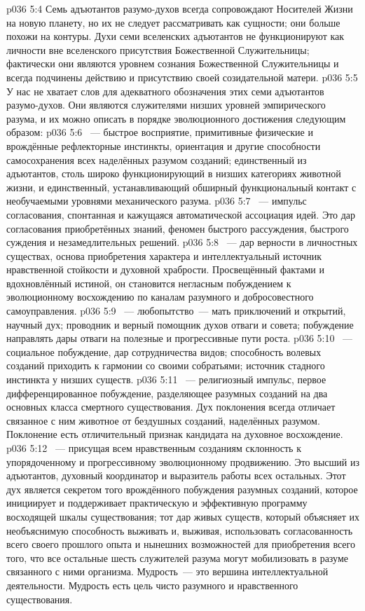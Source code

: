 \vs p036 5:4 \pc Семь адъютантов разумо\hyp{}духов всегда сопровождают Носителей Жизни на новую планету, но их не следует рассматривать как сущности; они больше похожи на контуры. Духи семи вселенских адъютантов не функционируют как личности вне вселенского присутствия Божественной Служительницы; фактически они являются уровнем сознания Божественной Служительницы и всегда подчинены действию и присутствию своей созидательной матери.
\vs p036 5:5 У нас не хватает слов для адекватного обозначения этих семи адъютантов разумо\hyp{}духов. Они являются служителями низших уровней эмпирического разума, и их можно описать в порядке эволюционного достижения следующим образом:
\vs p036 5:6 ~--- быстрое восприятие, примитивные физические и врождённые рефлекторные инстинкты, ориентация и другие способности самосохранения всех наделённых разумом созданий; единственный из адъютантов, столь широко функционирующий в низших категориях животной жизни, и единственный, устанавливающий обширный функциональный контакт с необучаемыми уровнями механического разума.
\vs p036 5:7 ~--- импульс согласования, спонтанная и кажущаяся автоматической ассоциация идей. Это дар согласования приобретённых знаний, феномен быстрого рассуждения, быстрого суждения и незамедлительных решений.
\vs p036 5:8 ~--- дар верности в личностных существах, основа приобретения характера и интеллектуальный источник нравственной стойкости и духовной храбрости. Просвещённый фактами и вдохновлённый истиной, он становится негласным побуждением к эволюционному восхождению по каналам разумного и добросовестного самоуправления.
\vs p036 5:9 ~--- любопытство~--- мать приключений и открытий, научный дух; проводник и верный помощник духов отваги и совета; побуждение направлять дары отваги на полезные и прогрессивные пути роста.
\vs p036 5:10 ~--- социальное побуждение, дар сотрудничества видов; способность волевых созданий приходить к гармонии со своими собратьями; источник стадного инстинкта у низших существ.
\vs p036 5:11 ~--- религиозный импульс, первое дифференцированное побуждение, разделяющее разумных созданий на два основных класса смертного существования. Дух поклонения всегда отличает связанное с ним животное от бездушных созданий, наделённых разумом. Поклонение есть отличительный признак кандидата на духовное восхождение.
\vs p036 5:12 ~--- присущая всем нравственным созданиям склонность к упорядоченному и прогрессивному эволюционному продвижению. Это высший из адъютантов, духовный координатор и выразитель работы всех остальных. Этот дух является секретом того врождённого побуждения разумных созданий, которое инициирует и поддерживает практическую и эффективную программу восходящей шкалы существования; тот дар живых существ, который объясняет их необъяснимую способность выживать и, выживая, использовать согласованность всего своего прошлого опыта и нынешних возможностей для приобретения всего того, что все остальные шесть служителей разума могут мобилизовать в разуме связанного с ними организма. Мудрость~--- это вершина интеллектуальной деятельности. Мудрость есть цель чисто разумного и нравственного существования.
